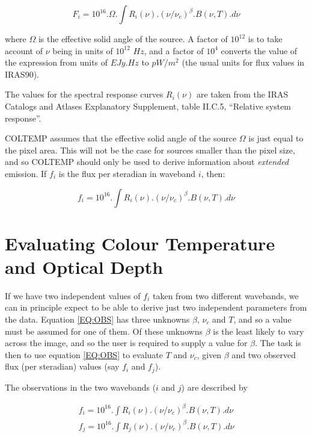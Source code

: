 \begin{equation}
F_{i} = 10^{16}.\Omega.\int R_{i}(\nu).(\nu/\nu_{c})^{\beta}.B( \nu, T ).d\nu
\end{equation}

where $\Omega$ is the effective solid angle of the source. A factor of $10^{12}$
is to take account of $\nu$ being in units of $10^{12}$ $Hz$, and a factor of
$10^{4}$ converts the value of the expression from units of $EJy.Hz$ to
$pW/m^{2}$ (the usual units for flux values in {\small IRAS90}). 

The values for the spectral response curves $R_{i}(\nu)$ are taken from the
{\small IRAS} Catalogs and Atlases Explanatory Supplement, table II.C.5,
``Relative system response''. 

{\small COLTEMP} assumes that the effective solid angle of the source $\Omega$
is just equal to the pixel area. This will not be the case for sources smaller
than the pixel size, and so {\small COLTEMP} should only be used to derive
information about {\em extended} emission. If $f_{i}$ is the flux per steradian
in waveband $i$, then: 

\begin{equation}
\label{EQ:OBS}
f_{i} = 10^{16}.\int R_{i}(\nu).(\nu/\nu_{c})^{\beta}.B( \nu, T ).d\nu
\end{equation}

\section{Evaluating Colour Temperature and Optical Depth}
If we have two independent values of $f_{i}$ taken from two different wavebands,
we can in principle expect to be able to derive just two independent parameters
from the data. Equation \ref{EQ:OBS} has three unknowns $\beta$, $\nu_{c}$ and
$T$, and so a value must be assumed for one of them. Of these unknowns $\beta$
is the least likely to vary across the image, and so the user is required to
supply a value for $\beta$. The task is then to use equation \ref{EQ:OBS} to
evaluate $T$ and $\nu_{c}$, given $\beta$ and two observed flux (per steradian)
values (say $f_{i}$ and $f_{j}$). 

The observations in the two wavebands ($i$ and $j$) are described by

\begin{eqnarray*}
f_{i} = 10^{16}.\int R_{i}(\nu).(\nu/\nu_{c})^{\beta}.B( \nu, T ).d\nu\\
f_{j} = 10^{16}.\int R_{j}(\nu).(\nu/\nu_{c})^{\beta}.B( \nu, T ).d\nu
\end{eqnarray*}

